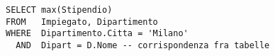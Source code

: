 \begin{lstlisting}
SELECT max(Stipendio)
FROM   Impiegato, Dipartimento
WHERE  Dipartimento.Citta = 'Milano'
  AND  Dipart = D.Nome -- corrispondenza fra tabelle
\end{lstlisting}
